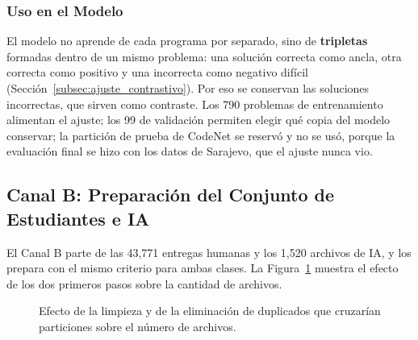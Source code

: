 \subsubsection{Uso en el Modelo}
El modelo no aprende de cada programa por separado, sino de \textbf{tripletas} formadas dentro de un mismo problema: una solución correcta como ancla, otra correcta como positivo y una incorrecta como negativo difícil (Sección~\ref{subsec:ajuste_contrastivo}). Por eso se conservan las soluciones incorrectas, que sirven como contraste. Los 790 problemas de entrenamiento alimentan el ajuste; los 99 de validación permiten elegir qué copia del modelo conservar; la partición de prueba de CodeNet se reservó y no se usó, porque la evaluación final se hizo con los datos de Sarajevo, que el ajuste nunca vio.

\subsection{Canal B: Preparación del Conjunto de Estudiantes e IA}
\label{subsec:preparacion_canal_b}

El Canal B parte de las 43,771 entregas humanas y los 1,520 archivos de IA, y los prepara con el mismo criterio para ambas clases. La Figura~\ref{fig:embudo_datos} muestra el efecto de los dos primeros pasos sobre la cantidad de archivos.

\begin{figure}[H]
    \centering
    \caption{Efecto de la limpieza y de la eliminación de duplicados que cruzarían particiones sobre el número de archivos.}
    \label{fig:embudo_datos}
\end{figure}


